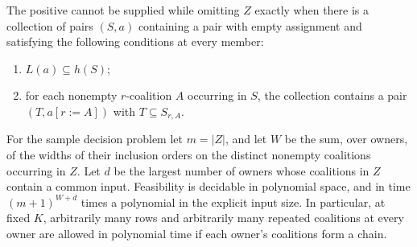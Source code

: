 \begin{theorem}
\label{core:thm:pointed-guard-cut}
The positive cannot be supplied while omitting $Z$ exactly when
there is a collection of pairs $(S,a)$ containing a pair with empty
assignment and satisfying the following conditions at every member:
\begin{enumerate}
\item $L(a)\subseteq h(S)$;
\item for each nonempty $r$-coalition $A$ occurring in $S$, the
collection contains a pair $(T,a[r:=A])$ with $T\subseteq S_{r,A}$.
\end{enumerate}
For the sample decision problem let $m=|Z|$, and let $W$ be the sum, over
owners, of the widths of their inclusion orders on the distinct
nonempty coalitions occurring in $Z$. Let $d$ be the largest
number of owners whose coalitions in $Z$ contain a common input.
Feasibility is decidable in polynomial space, and in time
$(m+1)^{W+d}$ times a polynomial in the explicit input size.
In particular, at fixed $K$, arbitrarily many
rows and arbitrarily many repeated coalitions at every owner are allowed
in polynomial time if each owner's coalitions form a chain.
\end{theorem}

